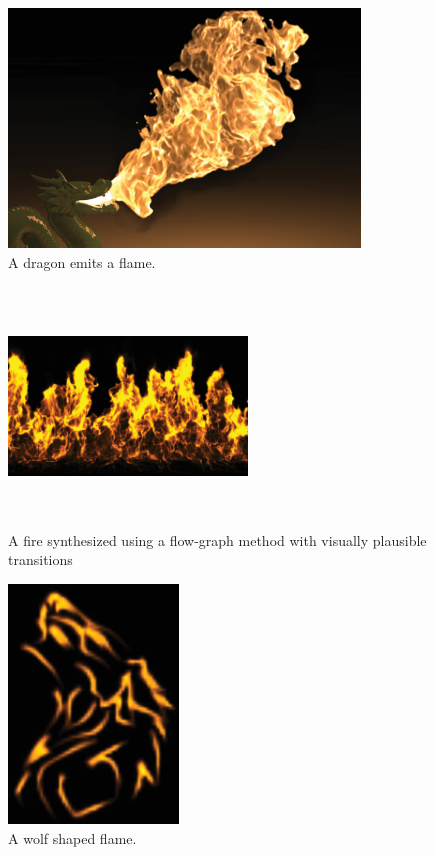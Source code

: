 \documentclass[11pt,twocolumn]{article}
\begin{document}
	\begin{figure}[h!]
		\caption{A dragon emits a flame.}
		\label{dragon_full}
		\centering
				\includegraphics[height=2.5in]{dragon_full.eps}
	\end{figure}
	\begin{figure}[h!]
		\caption{A fire synthesized using a flow-graph method with visually plausible transitions}
		\label{firewall}
		\centering
			\includegraphics[height=2.5in,width=2.5in]{firewall.eps}
	\end{figure}
	\begin{figure}[h!]
		\caption{A wolf shaped flame.}
		\label{wolf}
		\centering
			\includegraphics[height=2.5in]{wolf.eps}
	\end{figure}
	
\end{document}
